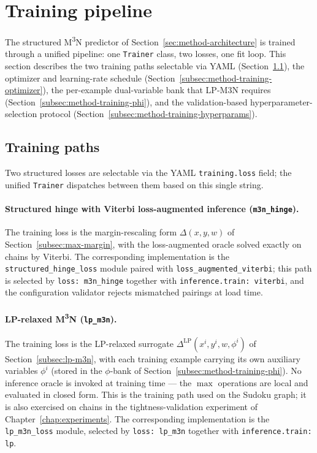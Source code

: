 \section{Training pipeline}
\label{sec:method-training}

The structured M\textsuperscript{3}N predictor of
Section~\ref{sec:method-architecture} is trained through a
unified pipeline: one \texttt{Trainer} class, two losses, one
fit loop. This section describes the two training paths
selectable via YAML
(Section~\ref{subsec:method-training-paths}), the optimizer
and learning-rate schedule
(Section~\ref{subsec:method-training-optimizer}), the
per-example dual-variable bank that LP-M3N requires
(Section~\ref{subsec:method-training-phi}), and the
validation-based hyperparameter-selection protocol
(Section~\ref{subsec:method-training-hyperparams}).

\subsection{Training paths}
\label{subsec:method-training-paths}

Two structured losses are selectable via the YAML
\texttt{training.loss} field; the unified \texttt{Trainer}
dispatches between them based on this single string.

\paragraph{Structured hinge with Viterbi loss-augmented
inference (\texttt{m3n\_hinge}).}
The training loss is the margin-rescaling form
$\Delta(x, y, w)$ of Section~\ref{subsec:max-margin}, with the
loss-augmented oracle solved exactly on chains by Viterbi. The
corresponding implementation is the
\texttt{structured\_hinge\_loss} module paired with
\texttt{loss\_augmented\_viterbi}; this path is selected by
\texttt{loss: m3n\_hinge} together with
\texttt{inference.train: viterbi}, and the configuration
validator rejects mismatched pairings at load time.

\paragraph{LP-relaxed M\textsuperscript{3}N (\texttt{lp\_m3n}).}
The training loss is the LP-relaxed surrogate
$\Delta^{\mathrm{LP}}(x^{i}, y^{i}, w, \phi^{i})$ of
Section~\ref{subsec:lp-m3n}, with each training example carrying
its own auxiliary variables $\phi^{i}$ (stored in the
$\phi$-bank of Section~\ref{subsec:method-training-phi}). No
inference oracle is invoked at training time --- the $\max$
operations are local and evaluated in closed form. This is the
training path used on the Sudoku graph; it is also exercised on
chains in the tightness-validation experiment of
Chapter~\ref{chap:experiments}. The corresponding implementation
is the \texttt{lp\_m3n\_loss} module, selected by
\texttt{loss: lp\_m3n} together with \texttt{inference.train: lp}.

